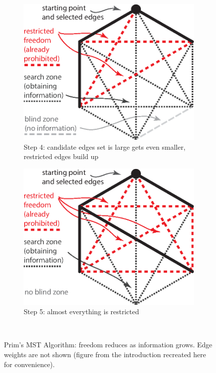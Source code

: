 \begin{figure}[th!]
\begin{subfigure}[b]{.48\textwidth}
      \label{fig:ch_mst_illustration-1}
  \end{subfigure}
  \\[.5cm]
  \begin{subfigure}[b]{.48\textwidth}
      \includegraphics[width=\linewidth]{figures/ch_mst/mst_illustration_2}
      \caption{Step 4: candidate edges set is large gets even smaller, restricted edges build up}
      \label{fig:ch_mst_illustration-2}
  \end{subfigure}
  \hfill
  \begin{subfigure}[b]{.48\textwidth}
      \includegraphics[width=\linewidth]{figures/ch_mst/mst_illustration_3}
      \caption{Step 5: almost everything is restricted}
      \label{fig:ch_mst_illustration-3}
  \end{subfigure}
  \\[.5cm]
  \caption{Prim's MST Algorithm: freedom reduces as information
    grows. Edge weights are not shown (figure from the introduction recreated
    here for convenience).}
  \label{fig:ch_mst_illustration}
\end{figure}

